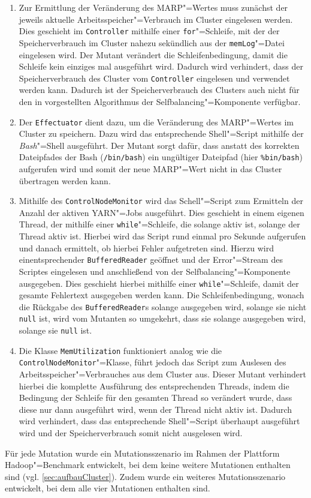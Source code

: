 \begin{enumerate}
    \item
    Zur Ermittlung der Veränderung des \ac{MARP}"=Wertes muss zunächst der jeweils aktuelle Arbeitsspeicher"=Verbrauch im Cluster eingelesen werden.
    Dies geschieht im \texttt{Controller} mithilfe einer \texttt{for}"=Schleife, mit der der Speicherverbrauch im Cluster nahezu sekündlich aus der \texttt{memLog}"=Datei eingelesen wird.
    Der Mutant verändert die Schleifenbedingung, damit die Schleife kein einziges mal ausgeführt wird.
    Dadurch wird verhindert, dass der Speicherverbrauch des Cluster vom \texttt{Controller} eingelesen und verwendet werden kann.
    Dadurch ist der Speicherverbrauch des Clusters auch nicht für den in \cite{zhang2016} vorgestellten Algorithmus der Selfbalancing"=Komponente verfügbar.
    
    \item 
    Der \texttt{Effectuator} dient dazu, um die Veränderung des \ac{MARP}"=Wertes im Cluster zu speichern.
    Dazu wird das entsprechende Shell"=Script mithilfe der \emph{Bash}"=Shell ausgeführt.
    Der Mutant sorgt dafür, dass anstatt des korrekten Dateipfades der Bash (\texttt{/bin/bash}) ein ungültiger Dateipfad (hier \texttt{\%bin/bash}) aufgerufen wird und somit der neue \ac{MARP}"=Wert nicht in das Cluster übertragen werden kann.
    
    \item
    Mithilfe des \texttt{ControlNodeMonitor} wird das Schell"=Script zum Ermitteln der Anzahl der aktiven \ac{YARN}"=Jobs ausgeführt.
    Dies geschieht in einem eigenen Thread, der mithilfe einer \texttt{while}"=Schleife, die solange aktiv ist, solange der Thread aktiv ist.
    Hierbei wird das Script rund einmal pro Sekunde aufgerufen und danach ermittelt, ob hierbei Fehler aufgetreten sind. Hierzu wird einentsprechender \texttt{BufferedReader} geöffnet und der Error"=Stream des Scriptes eingelesen und anschließend von der Selfbalancing"=Komponente ausgegeben.
    Dies geschieht hierbei mithilfe einer \texttt{while}"=Schleife, damit der gesamte Fehlertext ausgegeben werden kann.
    Die Schleifenbedingung, wonach die Rückgabe des \texttt{BufferedReader}s solange ausgegeben wird, solange sie nicht \texttt{null} ist, wird vom Mutanten so umgekehrt, dass sie solange ausgegeben wird, solange sie \texttt{null} ist.
    
    \item
    Die Klasse \texttt{MemUtilization} funktioniert analog wie die \texttt{ControlNodeMonitor}"=Klasse, führt jedoch das Script zum Auslesen des Arbeitsspeicher"=Verbrauches aus dem Cluster aus.
    Dieser Mutant verhindert hierbei die komplette Ausführung des entsprechenden Threads, indem die Bedingung der Schleife für den gesamten Thread so verändert wurde, dass diese nur dann ausgeführt wird, wenn der Thread nicht aktiv ist.
    Dadurch wird verhindert, dass das entsprechende Shell"=Script überhaupt ausgeführt wird und der Speicherverbrauch somit nicht ausgelesen wird.
\end{enumerate}

Für jede Mutation wurde ein Mutationsszenario im Rahmen der Plattform Hadoop"=Benchmark entwickelt, bei dem keine weitere Mutationen enthalten sind (vgl. \autoref{sec:aufbauCluster}).
Zudem wurde ein weiteres Mutationsszenario entwickelt, bei dem alle vier Mutationen enthalten sind.
